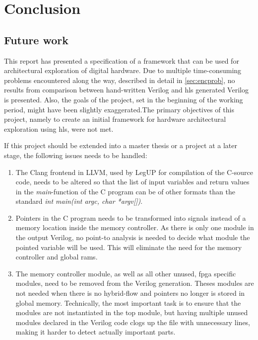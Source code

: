 \chapter{Conclusion}
\label{chp:conclusion} 

\section{Future work}
\label{sec:futurework} 
This report has presented a specification of a framework that can be used for architectural exploration of digital hardware. Due to multiple time-consuming problems encountered along the way, described in detail in \cref{sec:encprob}, no results from comparison between hand-written Verilog and \gls{hls} generated Verilog is presented. Also, the goals of the project, set in the beginning of the working period, might have been slightly exaggerated.The primary objectives of this project, namely to create an initial framework for hardware architectural exploration using \gls{hls}, were not met.

If this project should be extended into a master thesis or a project at a later stage, the following issues needs to be handled:
\begin{enumerate}\label{enum:futworkprob}
    \item \label{item:futworkprob}The Clang frontend in LLVM, used by LegUP for compilation of the C-source code, needs to be altered so that the list of input variables and return values in the \textit{main}-function of the C program can be of other formats than the standard \textit{int main(int argc, char *argv[])}.
    \item Pointers in the C program needs to be transformed into signals instead of a memory location inside the memory controller. As there is only one module in the output Verilog, no point-to analysis is needed to decide what module the pointed variable will be used. This will eliminate the need for the memory controller and global \gls{ram}s.
    \item The memory controller module, as well as all other unused, \gls{fpga} specific modules, need to be removed from the Verilog generation. Theses modules are not needed when there is no hybrid-flow and pointers no longer is stored in global memory. Technically, the most important task is to ensure that the modules are not instantiated in the top module, but having multiple unused modules declared in the Verilog code clogs up the file with unnecessary lines, making it harder to detect actually important parts.
\end{enumerate}


